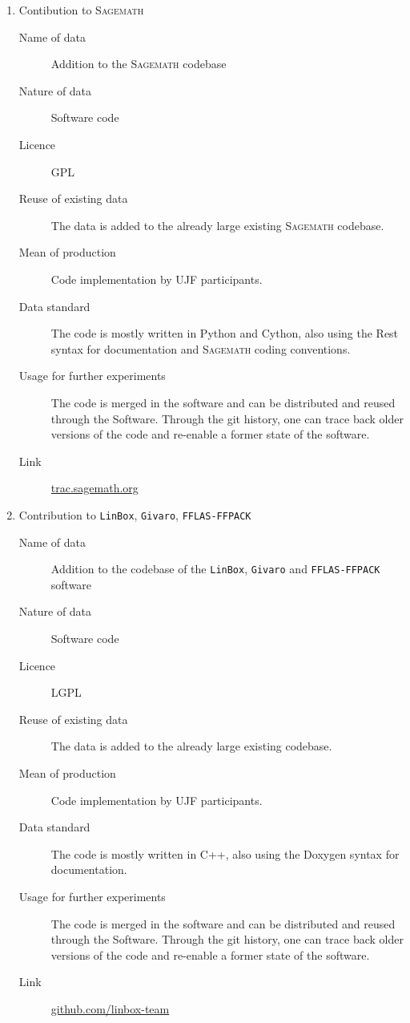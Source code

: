 \documentclass[12pt]{article}
\newcommand{\software}[1]{\textsc{#1}\xspace}
\newcommand{\Sage}{\software{Sagemath}}
\begin{document}
\begin{enumerate}

\item {Contibution to \Sage}

\begin{description}
\item[Name of data] Addition to the \Sage codebase
\item[Nature of data] Software code
\item[Licence] GPL
\item[Reuse of existing data] The data is added to the already large existing \Sage codebase.
\item[Mean of production] Code implementation by UJF participants.
\item[Data standard] The code is mostly written in Python and Cython, also using the Rest syntax for documentation and \Sage coding conventions.
\item [Usage for further experiments] The code is merged in the software and can be distributed and reused through the Software. Through the git history,
one can trace back older versions of the code and re-enable a former state of the software.
\item [Link] \href{http://trac.sagemath.org/}{trac.sagemath.org}
\end{description}


\item{Contribution to \texttt{LinBox}, \texttt{Givaro}, \texttt{FFLAS-FFPACK}}
\begin{description}
\item[Name of data] Addition to the codebase of the \texttt{LinBox},
  \texttt{Givaro} and \texttt{FFLAS-FFPACK} software
\item[Nature of data] Software code
\item[Licence] LGPL
\item[Reuse of existing data] The data is added to the already large existing codebase.
\item[Mean of production] Code implementation by UJF participants.
\item[Data standard] The code is mostly written in C++, also using the Doxygen syntax for documentation.
\item [Usage for further experiments] The code is merged in the software and can be distributed and reused through the Software. Through the git history,
one can trace back older versions of the code and re-enable a former state of the software.
\item [Link] \href{https://github.com/linbox-team}{github.com/linbox-team}
\end{description}


\end{enumerate}
\end{document}
